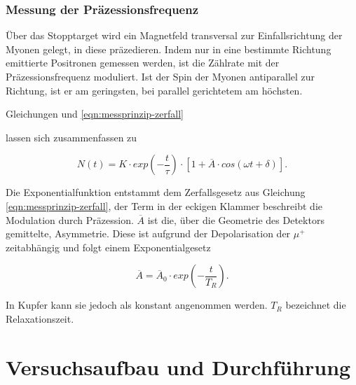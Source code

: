 \documentclass[a4paper,ngerman]{scrartcl}
\begin{document}
\subsubsection*{Messung der Präzessionsfrequenz}


Über das Stopptarget wird ein Magnetfeld transversal zur Einfallsrichtung der Myonen gelegt, in diese präzedieren.
Indem nur in eine bestimmte Richtung emittierte Positronen gemessen werden, ist die Zählrate mit der Präzessionsfrequenz moduliert. Ist der Spin der Myonen antiparallel zur Richtung, ist er am geringsten, bei parallel gerichtetem am höchsten.


Gleichungen und \ref{eqn:messprinzip-zerfall}


lassen sich zusammenfassen zu

\begin{equation}
N(t) = K \cdot exp(- \frac{t}{\tau}) \cdot \left[ 1 + \overline{A} \cdot cos(\omega t + \delta) \right] .
\end{equation}

Die Exponentialfunktion entstammt dem Zerfallsgesetz aus Gleichung \ref{eqn:messprinzip-zerfall}, der Term in der eckigen Klammer beschreibt die Modulation durch Präzession.
$\overline{A}$ ist die, über die Geometrie des Detektors gemittelte, Asymmetrie. Diese ist aufgrund der Depolarisation der $\mu^{+}$ zeitabhängig und folgt einem Exponentialgesetz

\begin{equation}
\overline{A} = \overline{A}_0 \cdot exp(- \frac{t}{ T_R }) .
\end{equation}

In Kupfer kann sie jedoch als konstant angenommen werden. $T_R$ bezeichnet die Relaxationszeit.
	
\clearpage

\section{Versuchsaufbau und Durchführung}
\end{document}
